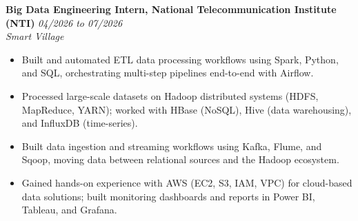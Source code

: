 \documentclass[10pt,letterpaper]{article}
\newcommand{\resumeItem}[1]{%
    \item\small{#1}
}
\newcommand{\resumeSubheading}[4]{%
    \vspace{2pt}
    \textbf{#1} \hfill \textit{\small #2}\\
    \textit{\small #3} \hfill \textit{\small #4}
    \vspace{1pt}
}
\newcommand{\resumeItemListStart}{\begin{itemize}}
\newcommand{\resumeItemListEnd}{\end{itemize}\vspace{2pt}}
\begin{document}
\resumeSubheading
    {Big Data Engineering Intern, National Telecommunication Institute (NTI)}
    {04/2026 to 07/2026}
    {}
    {Smart Village}
\resumeItemListStart
    \resumeItem{Built and automated ETL data processing workflows using Spark, Python, and SQL, orchestrating multi-step pipelines end-to-end with Airflow.}
    \resumeItem{Processed large-scale datasets on Hadoop distributed systems (HDFS, MapReduce, YARN); worked with HBase (NoSQL), Hive (data warehousing), and InfluxDB (time-series).}
    \resumeItem{Built data ingestion and streaming workflows using Kafka, Flume, and Sqoop, moving data between relational sources and the Hadoop ecosystem.}
    \resumeItem{Gained hands-on experience with AWS (EC2, S3, IAM, VPC) for cloud-based data solutions; built monitoring dashboards and reports in Power BI, Tableau, and Grafana.}
\resumeItemListEnd
\end{document}
